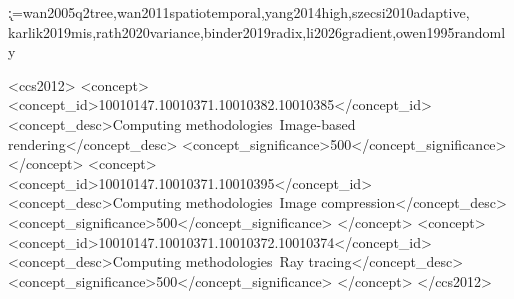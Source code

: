 \documentclass[acmtog,review]{acmart}
\begin{document}
\makeatletter
\ifdefined\cleancopy\else
  \@for\k:=wan2005q2tree,wan2011spatiotemporal,yang2014high,szecsi2010adaptive,%
           karlik2019mis,rath2020variance,binder2019radix,li2026gradient,owen1995randomly\do{%
    \expandafter\gdef\csname newref@\k\endcsname{}}
  \let\oldbibitem\bibitem
  \renewcommand\bibitem[2][]{%
    \oldbibitem[#1]{#2}%
    \@ifundefined{newref@#2}{\normalcolor}{\color{newcolor}}}
\fi
\makeatother


\begin{abstract}
We present a method for fast importance sampling HDR textured lights that allows real-time video-driven lighting.
Our method partitions a light's texture into a budgeted, variance-driven quadtree and builds an alias table over the resulting leaves, avoiding the cost of a dense per-frame CDF while still capturing
the texture's overall energy distribution. We present two variants: one that reuses the per-frame hierarchical partitions already present in the metadata of modern video codecs, and another that builds a budgeted quadtree to fit the entire sampling structure in the L1 cache of the GPU. Compared to the dense 2D CDF-inversion baseline, at a matched real-time
frame-time budget our technique reduces RMSE by 9–53\% depending on
scene, by letting the saved sampling cost be reinvested in additional light
samples. 
It also reduces memory consumption and transfers by several orders of magnitude when compared to state-of-the-art samplers.

\end{abstract}

\begin{CCSXML}
<ccs2012>
<concept>
<concept_id>10010147.10010371.10010382.10010385</concept_id>
<concept_desc>Computing methodologies~Image-based rendering</concept_desc>
<concept_significance>500</concept_significance>
</concept>
<concept>
<concept_id>10010147.10010371.10010395</concept_id>
<concept_desc>Computing methodologies~Image compression</concept_desc>
<concept_significance>500</concept_significance>
</concept>
<concept>
<concept_id>10010147.10010371.10010372.10010374</concept_id>
<concept_desc>Computing methodologies~Ray tracing</concept_desc>
<concept_significance>500</concept_significance>
</concept>
</ccs2012>
\end{CCSXML}
\end{document}
